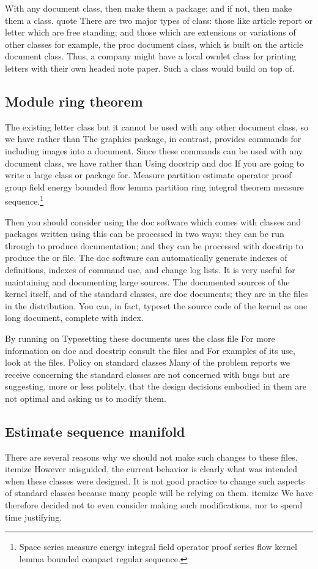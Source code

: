 \documentclass{article}
\begin{document}
With any document class, then make them a package; and if not, then make them a class. quote There are two major types of class: those like article report or letter which are free standing; and those which are extensions or variations of other classes for example, the proc document class, which is built on the article document class. Thus, a company might have a local ownlet class for printing letters with their own headed note paper. Such a class would build on top of.

\subsection{Module ring theorem}
The existing letter class but it cannot be used with any other document class, so we have rather than The graphics package, in contrast, provides commands for including images into a document. Since these commands can be used with any document class, we have rather than Using docstrip and doc If you are going to write a large class or package for.
Measure partition estimate operator proof group field energy bounded flow lemma partition ring integral theorem measure sequence.\footnote{Space series measure energy integral field operator proof series flow kernel lemma bounded compact regular sequence.}

Then you should consider using the doc software which comes with classes and packages written using this can be processed in two ways: they can be run through to produce documentation; and they can be processed with docstrip to produce the or file. The doc software can automatically generate indexes of definitions, indexes of command use, and change log lists. It is very useful for maintaining and documenting large sources. The documented sources of the kernel itself, and of the standard classes, are doc documents; they are in the files in the distribution. You can, in fact, typeset the source code of the kernel as one long document, complete with index.

By running on Typesetting these documents uses the class file For more information on doc and docstrip consult the files and For examples of its use, look at the files. Policy on standard classes Many of the problem reports we receive concerning the standard classes are not concerned with bugs but are suggesting, more or less politely, that the design decisions embodied in them are not optimal and asking us to modify them.

\subsection{Estimate sequence manifold}
There are several reasons why we should not make such changes to these files. itemize However misguided, the current behavior is clearly what was intended when these classes were designed. It is not good practice to change such aspects of standard classes because many people will be relying on them. itemize We have therefore decided not to even consider making such modifications, nor to spend time justifying.
\end{document}
